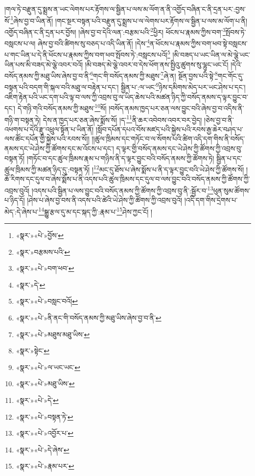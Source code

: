 །གལ་ཏེ་བརྫུན་དུ་སྨྲས་ན་ཡང་ལེགས་པར་རྟོགས་ལ་སྦྱིན་པ་ལས་མ་ལོག་ན་ནི་འགྱོད་བཞིན་ང་ནི་དྲན་པར་:བྱས་སོ་\footnote{«སྣར་»«པེ་»བྱོས་}ཞེས་བྱ་བ་ཡིན་ནོ། །གང་སྔར་བསྟན་པའི་བརྫུན་དུ་སྨྲས་པ་ལ་ལེགས་པར་རྟོགས་ལ་སྦྱིན་པ་ལས་མ་ལོག་པ་ནི། འགྱོད་བཞིན་ང་ནི་དྲན་པར་བྱོས། །ཞེས་བྱ་བ་དེའི་ལན་:བརྩམ་པའི་\footnote{«སྣར་»བརྩམས་པའི་}ཕྱིར། ཕོངས་པ་རྣམས་ཀྱིས་བག་\footnote{«སྣར་»«པེ་»བག་ཕབ་}སྤོབས་ཏེ་བསླངས་པ་ལ། ཞེས་བྱ་བའི་ཚིགས་སུ་བཅད་པ་འདི་ཡིན་ནོ། །དེས་\footnote{«སྣར་»དེ་}ན་ཕོངས་པ་རྣམས་ཀྱིས་བག་ཕབ་སྟེ་བསླངས་པ་གང་ཡིན་པ་དེ་ནི་ཕོངས་པ་རྣམས་ཀྱིས་བག་ཕབ་སྤོབས་ཏེ་:བསླངས་པའོ།\footnote{«སྣར་»«པེ་»བསླང་བའོ།} །མི་བཟད་པ་ཡང་ཡིན་ལ་མེ་ལྕེ་ཡང་ཡིན་པས་མི་བཟད་མེ་ལྕེ་འབར་བའོ། །མི་བཟད་མེ་ལྕེ་འབར་བ་དེས་ཕོག་ནས་སྤྱིའུ་ཚུགས་སུ་ལྷུང་ཡང་ངོ། །དེའི་བསོད་ནམས་ཀྱི་མཐུ་ཡིས་ཞེས་བྱ་བ་ནི་\footnote{«སྣར་»«པེ་»ནི་ནང་གི་བསོད་ནམས་ཀྱི་མཐུ་ཡིས་ཞེས་བྱ་བ་ནི་}གང་གི་བསོད་ནམས་ཀྱི་མཐུས་\footnote{«སྣར་»«པེ་»མཐུས་མཐུ་ཡིས་}ཞེ་ན། སྔོན་བྱས་པའི་སྟེ་\footnote{«སྣར་»སྟེང་}གང་གོང་དུ་བསྟན་པའི་བདག་གི་སྐལ་བའི་མཐུ་ལ་བརྟེན་པ་དང་། སྦྱིན་པ་:ལ་ཡང་\footnote{«སྣར་»«པེ་»ལ་ཡང་ཡང་}ཉེས་དམིགས་མེད་པར་ཡང་ཤེས་པ་དང་། འཇིག་རྟེན་པའི་ཡང་དག་པའི་ལྟ་བ་ལས་ཀྱི་འབྲས་བུ་ལ་ཡིད་ཆེས་པའི་མཚན་ཉིད་ཀྱི་བསོད་ནམས་ད་ལྟར་བྱུང་བ་དང་། དེ་གཉི་གའི་བསོད་ནམས་ཀྱི་མཐུས་\footnote{«སྣར་»«པེ་»མཐུ་ཡིས་}སོ། །བསོད་ནམས་ཁྱད་པར་ཅན་ལས་བྱུང་བའི་ཞེས་བྱ་བ་འདིས་ནི་གཉི་ག་བསྟན་ཏེ། དེས་ན་ཁྱད་པར་ཅན་ཞེས་སྨོས་སོ། །ད་\footnote{«སྣར་»«པེ་»དེ་}ནི་ཆར་འབེབས་འབར་བར་བྱེད། །ཅེས་བྱ་བ་ནི་འཕགས་པ་དེའི་རྫུ་འཕྲུལ་སྟོན་པ་ཡིན་ནོ། །སློབ་དཔོན་དཔའ་བོས་མཛད་པའི་སྐྱེས་པའི་རབས་རྒྱ་ཆེར་བཤད་པ་ལས་ཚོང་དཔོན་གྱི་སྐྱེས་པའི་རབས་སོ།། །།ཚུལ་ཁྲིམས་དང་གཏོང་བ་ལ་སོགས་པའི་ཚིག་འདི་དག་གིས་ནི་བསོད་ནམས་དང་ཡེ་ཤེས་ཀྱི་ཚོགས་དང་མ་འོངས་པ་དང་། ད་ལྟར་གྱི་བསོད་ནམས་དང་ཡེ་ཤེས་ཀྱི་ཚོགས་ཀྱི་འབྲས་བུ་བསྟན་ཏོ། །གཏོང་བ་དང་ཚུལ་ཁྲིམས་རྣམ་པ་གཉིས་ནི་ད་ལྟར་བྱུང་བའི་བསོད་ནམས་ཀྱི་ཚོགས་ཏེ། སྦྱིན་པ་དང་ཚུལ་ཁྲིམས་ཀྱི་མཚན་ཉིད་དུ་:བསྟན་ཏོ། །\footnote{«སྣར་»«པེ་»བསྟན་ཏེ་}མང་དུ་ཐོས་པ་ཞེས་སྨོས་པ་ནི་ད་ལྟར་བྱུང་བའི་ཡེ་ཤེས་ཀྱི་ཚོགས་སོ། །ཆོ་རིགས་དང་དུལ་བ་ཞེས་སྨོས་པ་ནི་འདས་པའི་ཚུལ་ཁྲིམས་དང་དུལ་བ་ལས་བྱུང་བའི་བསོད་ནམས་ཀྱི་ཚོགས་ཀྱི་འབྲས་བུའོ། །འདས་པའི་སྦྱིན་པ་ལས་བྱུང་བའི་བསོད་ནམས་ཀྱི་ཚོགས་ཀྱི་འབྲས་བུ་ནི་:སྦྱོར་བ་\footnote{«སྣར་»«པེ་»འབྱོར་པ་}ཕུན་སུམ་ཚོགས་པ་ཉིད་དོ། །ཤེས་པ་ཞེས་བྱ་བས་ནི་འདས་པའི་ཚེའི་ཡེ་ཤེས་ཀྱི་ཚོགས་ཀྱི་འབྲས་བུའོ། །འདི་དག་གིས་དྲེགས་པ་མེད་:དེ་ཞེས་པ་\footnote{«སྣར་»«པེ་»དེ་ཞེས་}སྒྱུ་རྩལ་དུ་མ་དང་སྐད་ཀྱི་:རྣམ་པ་\footnote{«སྣར་»«པེ་»རྣམ་པར་}ཤེས་ཀྱང་ངོ། །
